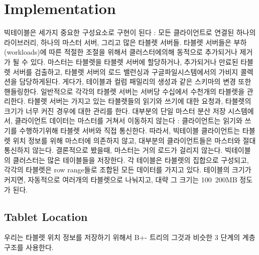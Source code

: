 \documentclass[twocolumn]{article}
\begin{document}
\section{Implementation}
빅테이블은 세가지 중요한 구성요소로 구현이 된다 : 모든 클라이언트로 연결된 하나의 라이브러리, 하나의 마스터 서버, 그리고 많은 타블렛 서버들.
타블렛 서버들은 부하(workloads)에 따른 적절한 조절을 위해서 클러스터에의해 동적으로 추가되거나 제거가 될 수 있다. 마스터는 타블렛을 타블렛 서버에 할당하거나, 추가되거나 만료된 타블렛 서버를 검출하고, 타블렛 서버의 로드 밸런싱과 구글파일시스템에서의 가비지 콜렉션을 담당하게된다. 게다가, 테이블과 컬럼 패밀리의 생성과 같은 스키마의 변경 또한 핸들링한다. 일반적으로 각각의 타블렛 서버는 서버당 수십에서 수천개의 타블렛을 관리한다. 타블렛 서버는 가지고 있는 타블렛들의 읽기와 쓰기에 대한 요청과, 타블렛의 크기가 너무 커진 경우에 대한 관리를 한다.
대부분의 단일 마스터 분산 저장 시스템에서, 클라이언트 데이터는 마스터를 거쳐서 이동하지 않는다 : 클라이언트는 읽기와 쓰기를 수행하기위해 타블렛 서버와 직접 통신한다. 따라서, 빅테이블 클라이언트는 타블렛 위치 정보를 위해 마스터에 의존하지 않고, 대부분의 클라이언트들은 마스터와 절대 통신하지 않는다. 결론적으로 봤을때, 마스터는 거의 로드가 걸리지 않는다.
빅테이블의 클러스터는 많은 테이블들을 저장한다. 각 테이블은 타블렛의 집합으로 구성되고, 각각의 타블렛은 row range들로 조합된 모든 데이터를 가지고 있다. 테이블의 크기가 커지면, 자동적으로 여러개의 타블렛으로 나눠지고, 대략 그 크기는 100~200MB 정도가 된다.
 
\subsection{Tablet Location}
우리는 타블렛 위치 정보를 저장하기 위해서 B+- 트리의 그것과 비슷한 3 단계의 계층구조를 사용한다.

\end{document}
